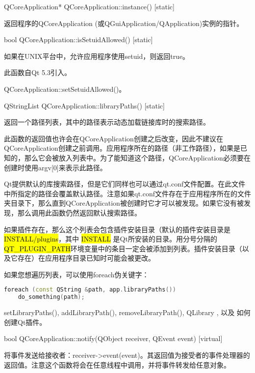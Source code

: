 QCoreApplication* QCoreApplication::instance() [static]

返回程序的QCoreApplication (或QGuiApplication/QApplication)实例的指针。

bool QCoreApplication::isSetuidAllowed() [static]

如果在UNIX平台中，允许应用程序使用setuid，则返回true。

此函数自Qt 5.3引入。


\begin{notice}[另请参阅]
QCoreApplication::setSetuidAllowed()。
\end{notice}

QStringList QCoreApplication::libraryPaths() [static]

返回一个路径列表，其中的路径表示动态加载链接库时的搜索路径。

此函数的返回值也许会在QCoreApplication创建之后改变，因此不建议在QCoreApplication创建之前调用。应用程序所在的路径（非工作路径），如果是已知的，那么它会被放入列表中。为了能知道这个路径，QCoreApplication必须要在创建时使用argv[0]来表示此路径。

Qt提供默认的库搜索路径，但是它们同样也可以通过qt.conf文件配置。在此文件中所指定的路径会覆盖默认路径。注意如果qt.conf文件存在于应用程序所在的文件夹目录下，那么直到QCoreApplication被创建时它才可以被发现。如果它没有被发现，那么调用此函数仍然返回默认搜索路径。

如果插件存在，那么这个列表会包含插件安装目录（默认的插件安装目录是
\hl{INSTALL/plugins}，其中 \hl{INSTALL} 是Qt所安装的目录。用分号分隔的\hl{QT\_PLUGIN\_PATH}环境变量中的条目一定会被添加到列表。插件安装目录（以及它存在）在应用程序目录已知时可能会被更改。

如果您想遍历列表，可以使用foreach伪关键字：

\begin{lstlisting}[language=C++]
foreach (const QString &path, app.libraryPaths())
    do_something(path);
\end{lstlisting}



\begin{notice}[另请参阅]
 setLibraryPaths(), addLibraryPath(), removeLibraryPath(), QLibrary , 以及 如何创建Qt插件。
\end{notice}

bool QCoreApplication::notify(QObject receiver, QEvent event) [virtual]

将事件发送给接收者：receiver->event(event)。其返回值为接受者的事件处理器的返回值。注意这个函数将会在任意线程中调用，并将事件转发给任意对象。

